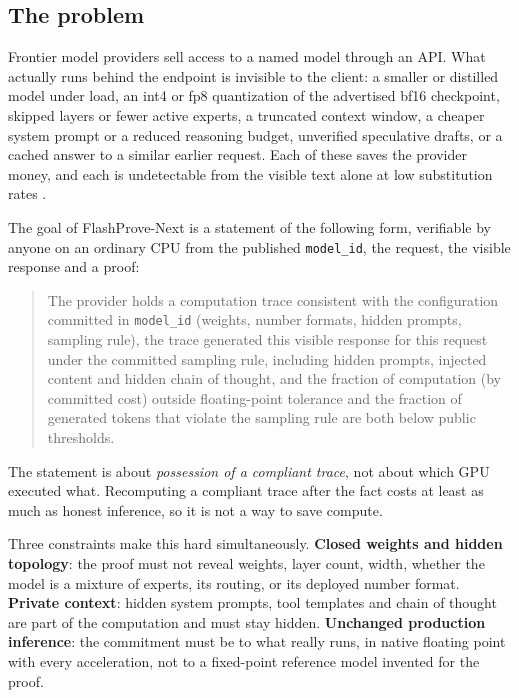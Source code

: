\documentclass[10pt]{article}
\begin{document}
\subsection{The problem}
Frontier model providers sell access to a named model through an API. What actually runs behind the endpoint is invisible to the client: a smaller or distilled model under load, an int4 or fp8 quantization of the advertised bf16 checkpoint, skipped layers or fewer active experts, a truncated context window, a cheaper system prompt or a reduced reasoning budget, unverified speculative drafts, or a cached answer to a similar earlier request. Each of these saves the provider money, and each is undetectable from the visible text alone at low substitution rates \cite{CSZS25,GLG25}.

The goal of FlashProve-Next is a statement of the following form, verifiable by anyone on an ordinary CPU from the published \texttt{model\_\allowbreak{}id}, the request, the visible response and a proof:

\begin{quote}The provider holds a computation trace consistent with the configuration committed in \texttt{model\_\allowbreak{}id} (weights, number formats, hidden prompts, sampling rule), the trace generated this visible response for this request under the committed sampling rule, including hidden prompts, injected content and hidden chain of thought, and the fraction of computation (by committed cost) outside floating-point tolerance and the fraction of generated tokens that violate the sampling rule are both below public thresholds.\end{quote}
The statement is about \emph{possession of a compliant trace}, not about which GPU executed what. Recomputing a compliant trace after the fact costs at least as much as honest inference, so it is not a way to save compute.

Three constraints make this hard simultaneously. \textbf{Closed weights and hidden topology}: the proof must not reveal weights, layer count, width, whether the model is a mixture of experts, its routing, or its deployed number format. \textbf{Private context}: hidden system prompts, tool templates and chain of thought are part of the computation and must stay hidden. \textbf{Unchanged production inference}: the commitment must be to what really runs, in native floating point with every acceleration, not to a fixed-point reference model invented for the proof.
\end{document}

